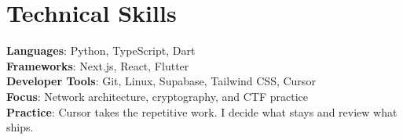 \documentclass[letterpaper,11pt]{article}
\begin{document}
\section{Technical Skills}
 \begin{itemize}[leftmargin=0.15in, label={}]
    \small{\item{
     \textbf{Languages}{: Python, TypeScript, Dart} \\
     \textbf{Frameworks}{: Next.js, React, Flutter} \\
     \textbf{Developer Tools}{: Git, Linux, Supabase, Tailwind CSS, Cursor} \\
     \textbf{Focus}{: Network architecture, cryptography, and CTF practice} \\
     \textbf{Practice}{: Cursor takes the repetitive work. I decide what stays and review what ships.}
    }}
 \end{itemize}


\end{document}
